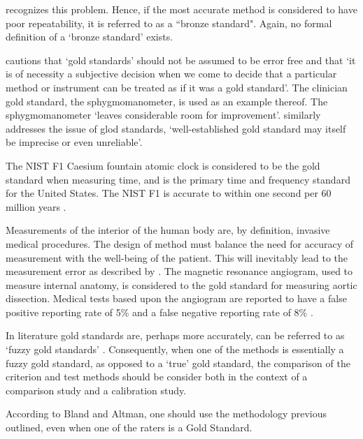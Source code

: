 \documentclass[12pt, a4paper]{report}
\theoremstyle{plain}
\theoremstyle{definition}
\theoremstyle{remark}
\begin{document}
		\citet{dunnSEME} recognizes this problem. Hence, if the most accurate method is considered to have poor repeatability, it is referred to as a ``bronze standard".  Again, no formal definition of a `bronze standard' exists.
		
	\citet[p.47]{DunnSEME} cautions that `gold standards' should not be
	assumed to be error free and that `it is of necessity a subjective
	decision when we come to decide that a particular method or
	instrument can be treated as if it was a gold standard'. The
	clinician gold standard, the sphygmomanometer, is used as an
	example thereof.  The sphygmomanometer `leaves considerable room
	for improvement'. \citet{pizzi} similarly
	addresses the issue of glod standards, `well-established gold
	standard may itself be imprecise or even unreliable'.
	
	
	The NIST F1 Caesium fountain atomic clock is considered to be the
	gold standard when measuring time, and is the primary time and
	frequency standard for the United States. The NIST F1 is accurate
	to within one second per 60 million years \citep{NIST}.
	
	Measurements of the interior of the human body are, by definition,
	invasive medical procedures. The design of method must balance the
	need for accuracy of measurement with the well-being of the
	patient. This will inevitably lead to the measurement error as
	described by \citet{DunnSEME}. The magnetic resonance angiogram,
	used to measure internal anatomy, is considered to the gold
	standard for measuring aortic dissection. Medical tests based upon
	the angiogram are reported to have a false positive reporting rate
	of 5\% and a false negative reporting rate of 8\% \citep{ACR}.
	
	In literature gold standards are, perhaps more accurately, can be referred to as
	`fuzzy gold standards' \citep{phelps}. Consequently, when one of the methods is
	essentially a fuzzy gold standard, as opposed to a `true' gold
	standard, the comparison of the criterion and test methods should
	be consider both in the context of a comparison study and a
	calibration study.
	
	
	
	
	According to Bland and Altman, one should use the methodology
	previous outlined, even when one of the raters is a Gold Standard.
	
	
\end{document}
